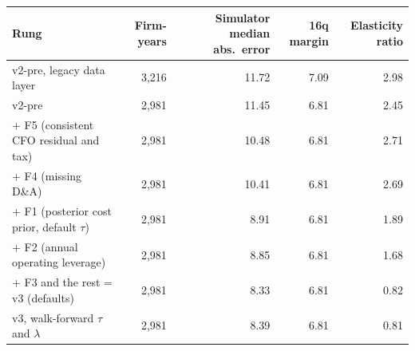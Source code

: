 \begin{tabular}{lrrrr}
\toprule
Rung & Firm-years & Simulator median abs.\ error & 16q margin & Elasticity ratio \\
\midrule
v2-pre, legacy data layer & 3{,}216 & 11.72 & 7.09 & 2.98 \\
v2-pre & 2{,}981 & 11.45 & 6.81 & 2.45 \\
+ F5 (consistent CFO residual and tax) & 2{,}981 & 10.48 & 6.81 & 2.71 \\
+ F4 (missing D\&A) & 2{,}981 & 10.41 & 6.81 & 2.69 \\
+ F1 (posterior cost prior, default $\tau$) & 2{,}981 & 8.91 & 6.81 & 1.89 \\
+ F2 (annual operating leverage) & 2{,}981 & 8.85 & 6.81 & 1.68 \\
+ F3 and the rest = v3 (defaults) & 2{,}981 & 8.33 & 6.81 & 0.82 \\
v3, walk-forward $\tau$ and $\lambda$ & 2{,}981 & 8.39 & 6.81 & 0.81 \\
\bottomrule
\end{tabular}
